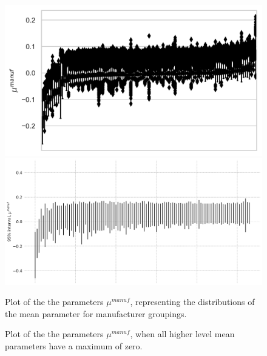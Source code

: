 \documentclass[a4paper]{article}
\begin{document}
\begin{figure}
\begin{minipage}{.45\textwidth}
  \centering
  \includegraphics[width=1\linewidth]{figures/BayManPlot.png}
 \end{minipage}\qquad
\begin{minipage}{.45\textwidth}
  \centering
  \includegraphics[width=1\linewidth]{figures/BayManPlot_const.png}
 \end{minipage}

\bigskip

\begin{minipage}[t]{.45\textwidth}
\centering
  \caption{Plot of the the parameters $\mu^{manuf}$, representing the distributions of the mean parameter for manufacturer groupings.}
   \label{fig:BayManPlot}
\end{minipage}\qquad
\begin{minipage}[t]{.45\textwidth}
\centering
  \caption{Plot of the the parameters $\mu^{manuf}$, when all higher level mean parameters have a maximum of zero.}
    \label{fig:BayManPlot_const}
\end{minipage}
\end{figure}
\end{document}
